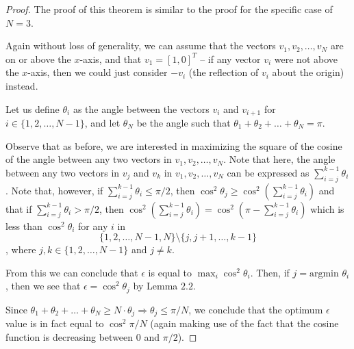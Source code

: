\documentclass[11pt,letterpaper,twoside,english]{article}
\theoremstyle{theorem}
\theoremstyle{remark}
\begin{document}
\begin{proof}
The proof of this theorem is similar to the proof for the specific case of $N=3$.

Again without loss of generality, we can assume that the vectors $v_1, v_2, \ldots, v_N$ are on or above the $x$-axis, and that $v_1 = [1,0]^T$ -- if any vector $v_i$ were not above the $x$-axis, then we could just consider $-v_i$ (the reflection of $v_i$ about the origin) instead.

Let us define $\theta_i$ as the angle between the vectors $v_i$ and $v_{i+1}$ for $i \in \{1, 2, \ldots, N-1\}$, and let $\theta_N$ be the angle such that $\theta_1 + \theta_2 + \ldots + \theta_N = \pi$.

Observe that as before, we are interested in maximizing the square of the cosine of the angle between any two vectors in $v_1, v_2, \ldots, v_N$. Note that here, the angle between any two vectors in $v_j$ and $v_k$ in $v_1, v_2, \ldots, v_N$ can be expressed as $\sum_{i=j} ^{k-1} \theta_i$. Note that, however, if $\sum_{i=j}^{k-1} \theta_i \leq \pi/2$, then $\cos^2 \theta_j \geq \cos^2(\sum_{i=j}^{k-1} \theta_i)$ and that if $\sum_{i=j}^{k-1} \theta_i > \pi/2$, then $\cos^2 (\sum_{i=j}^{k-1} \theta_i) = \cos^2 (\pi - \sum_{i=j}^{k-1} \theta_i)$ which is less than $\cos^2 \theta_i$ for any $i$ in $$\{1, 2, \ldots, N-1, N\} \setminus \{j, j+1, \ldots, k-1\}$$, where $j, k \in \{1, 2, \ldots, N-1\}$ and $j \neq k$.

From this we can conclude that $\epsilon$ is equal to $\max_i \cos^2 \theta_i$. Then, if $j = \text{argmin } \theta_i$, then we see that $\epsilon = \cos^2 \theta_j$ by Lemma $2.2$.

Since $\theta_ 1 + \theta_2 + \ldots + \theta_N \geq N \cdot \theta_j \Rightarrow \theta_j \leq \pi/N$, we conclude that the optimum $\epsilon$ value is in fact equal to $\cos^2 \pi/N$ (again making use of the fact that the cosine function is decreasing between $0$ and $\pi/2$).
\end{proof}
\end{document}
